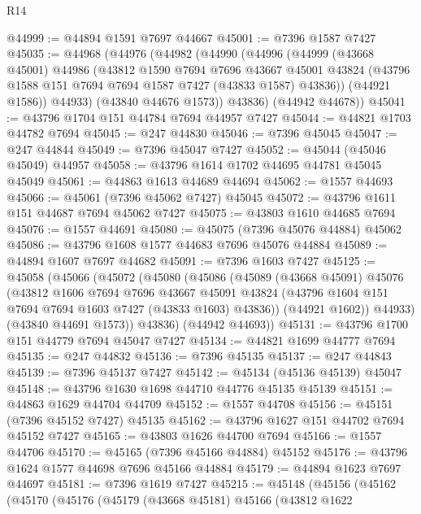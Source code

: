 \begin{lexlean}{R14}
\begin{coremodule}
@44999 := @44894 @1591 @7697 @44667
@45001 := @7396 @1587 @7427
@45035 := @44968
    (@44976
      (@44982
        (@44990
          (@44996
            (@44999
              (@43668 @45001)
              @44986
              (@43812
                @1590
                @7694
                @7696
                @43667
                @45001
                @43824
                (@43796 @1588 @151 @7694 @7694 @1587 @7427 (@43833 @1587) @43836))
              (@44921 @1586))
            @44933)
          (@43840 @44676 @1573))
        @43836)
      (@44942 @44678))
@45041 := @43796 @1704 @151 @44784 @7694 @44957 @7427
@45044 := @44821 @1703 @44782 @7694
@45045 := @247 @44830
@45046 := @7396 @45045
@45047 := @247 @44844
@45049 := @7396 @45047 @7427
@45052 := @45044 (@45046 @45049) @44957
@45058 := @43796 @1614 @1702 @44695 @44781 @45045 @45049
@45061 := @44863 @1613 @44689 @44694
@45062 := @1557 @44693
@45066 := @45061 (@7396 @45062 @7427) @45045
@45072 := @43796 @1611 @151 @44687 @7694 @45062 @7427
@45075 := @43803 @1610 @44685 @7694
@45076 := @1557 @44691
@45080 := @45075 (@7396 @45076 @44884) @45062
@45086 := @43796 @1608 @1577 @44683 @7696 @45076 @44884
@45089 := @44894 @1607 @7697 @44682
@45091 := @7396 @1603 @7427
@45125 := @45058
    (@45066
      (@45072
        (@45080
          (@45086
            (@45089
              (@43668 @45091)
              @45076
              (@43812
                @1606
                @7694
                @7696
                @43667
                @45091
                @43824
                (@43796 @1604 @151 @7694 @7694 @1603 @7427 (@43833 @1603) @43836))
              (@44921 @1602))
            @44933)
          (@43840 @44691 @1573))
        @43836)
      (@44942 @44693))
@45131 := @43796 @1700 @151 @44779 @7694 @45047 @7427
@45134 := @44821 @1699 @44777 @7694
@45135 := @247 @44832
@45136 := @7396 @45135
@45137 := @247 @44843
@45139 := @7396 @45137 @7427
@45142 := @45134 (@45136 @45139) @45047
@45148 := @43796 @1630 @1698 @44710 @44776 @45135 @45139
@45151 := @44863 @1629 @44704 @44709
@45152 := @1557 @44708
@45156 := @45151 (@7396 @45152 @7427) @45135
@45162 := @43796 @1627 @151 @44702 @7694 @45152 @7427
@45165 := @43803 @1626 @44700 @7694
@45166 := @1557 @44706
@45170 := @45165 (@7396 @45166 @44884) @45152
@45176 := @43796 @1624 @1577 @44698 @7696 @45166 @44884
@45179 := @44894 @1623 @7697 @44697
@45181 := @7396 @1619 @7427
@45215 := @45148
    (@45156
      (@45162
        (@45170
          (@45176
            (@45179
              (@43668 @45181)
              @45166
              (@43812
                @1622

\end{coremodule}
\end{lexlean}
